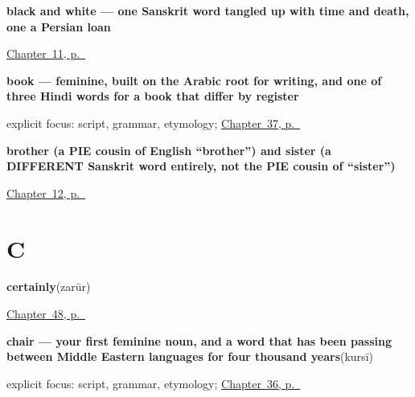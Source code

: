 \noindent\begin{minipage}[t]{\linewidth}
\raggedright
\textbf{black and white — one Sanskrit word tangled up with time and death, one a Persian loan}\enspace\emph{ }\par
\footnotesize \hyperref[ch:hi-core-colours]{Chapter~11, p.~\pageref*{ch:hi-core-colours}}
\end{minipage}\par\smallskip

\noindent\begin{minipage}[t]{\linewidth}
\raggedright
\textbf{book — feminine, built on the Arabic root for writing, and one of three Hindi words for a book that differ by register}\enspace\emph{}\par
\footnotesize explicit focus: script, grammar, etymology; \hyperref[ch:hi-one-tea-please]{Chapter~37, p.~\pageref*{ch:hi-one-tea-please}}
\end{minipage}\par\smallskip

\noindent\begin{minipage}[t]{\linewidth}
\raggedright
\textbf{brother (a PIE cousin of English \textquotedblleft{}brother\textquotedblright{}) and sister (a DIFFERENT Sanskrit word entirely, not the PIE cousin of \textquotedblleft{}sister\textquotedblright{})}\enspace\emph{ }\par
\footnotesize \hyperref[ch:hi-family]{Chapter~12, p.~\pageref*{ch:hi-family}}
\end{minipage}\par\smallskip

\section*{C}

\noindent\begin{minipage}[t]{\linewidth}
\raggedright
\textbf{certainly}\enspace\emph{}\enspace(zarūr)\par
\footnotesize \hyperref[ch:hi-replies]{Chapter~48, p.~\pageref*{ch:hi-replies}}
\end{minipage}\par\smallskip

\noindent\begin{minipage}[t]{\linewidth}
\raggedright
\textbf{chair — your first feminine noun, and a word that has been passing between Middle Eastern languages for four thousand years}\enspace\emph{}\enspace(kursī)\par
\footnotesize explicit focus: script, grammar, etymology; \hyperref[ch:hi-one-house-four-languages]{Chapter~36, p.~\pageref*{ch:hi-one-house-four-languages}}
\end{minipage}\par\smallskip

